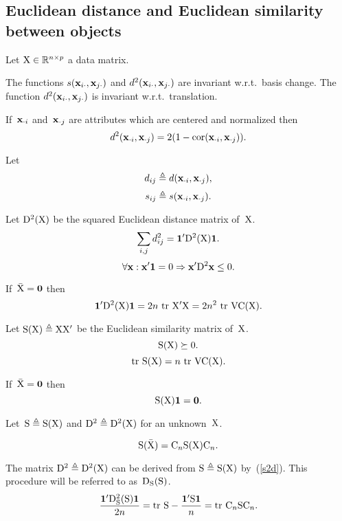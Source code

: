 \documentclass[10pt,a4paper]{article}
\theoremstyle{plain} \newtheorem{Lem}{Lemma}
\begin{document}
\subsection {Euclidean distance and Euclidean similarity between objects}
Let $\mathrm X \in \mathbb R^{n \times p}$ a data matrix.

The functions $s(\mathbf x_{i \cdot}, \mathbf x_{j \cdot})$ and $d^2(\mathbf x_{i \cdot}, \mathbf x_{j \cdot})$ are invariant w.r.t.~basis change.
The function $d^2(\mathbf x_{i\cdot}, \mathbf x_{j\cdot})$ is invariant w.r.t.~translation.

If~$\mathbf x_{\cdot i}$ and~$\mathbf x_{\cdot j}$ are attributes which are centered and normalized
then
\begin{equation}\label{d2rho}
d^2(\mathbf x_{\cdot i}, \mathbf x_{\cdot j}) = 2 (1 - \mathrm {cor}(\mathbf x_{\cdot i}, \mathbf x_{\cdot j})).
\end{equation}

Let
$$ d_{ij} \triangleq d(\mathbf x_{\cdot i}, \mathbf x_{\cdot j}), $$
$$ s_{ij} \triangleq s(\mathbf x_{\cdot i}, \mathbf x_{\cdot j}). $$

Let $\mathrm D^2(\mathrm X)$ be the squared Euclidean distance matrix of~$\mathrm X$.
$$ \sum_{i,j} d^2_{ij} = \mathbf 1' \mathrm D^2(\mathrm X) \mathbf 1. $$
$$ \forall \mathbf x : \mathbf x' \mathbf 1 = 0 \Rightarrow \mathbf x' \mathrm D^2 \mathbf x \le 0. $$

If~$\bar {\mathrm X} = \mathbf 0$ then
\begin{equation}\label{sumD2}
\mathbf 1' \mathrm D^2(\mathrm X) \mathbf 1 = 2n \ \mathrm {tr} \  \mathrm X' \mathrm X  = 2n^2 \ \mathrm {tr} \  \mathrm {VC} (\mathrm X).
\end{equation}

Let $\mathrm S(\mathrm X) \triangleq \mathrm X \mathrm X'$ be the Euclidean similarity matrix of~$\mathrm X$.
$$\mathrm S(\mathrm X) \succeq 0. $$
\begin{equation}\label{trc_S_VC}
  \mathrm {tr} \  \mathrm S(\mathrm X) = n \ \mathrm {tr} \  \mathrm {VC}(\mathrm X).
\end{equation}

If~$\bar {\mathrm X} = \mathbf 0$ then
$$ \mathrm S(\mathrm X) \mathbf 1 = \mathbf 0. $$

Let~$\mathrm S \triangleq \mathrm S(\mathrm X)$ and $\mathrm D^2 \triangleq \mathrm D^2 (\mathrm X)$ for an unknown~$\mathrm X$.

$$ \mathrm S(\bar {\mathrm X}) =  \mathrm C_n {\mathrm S} (\mathrm X)  \mathrm C_n. $$

The matrix $\mathrm D^2 \triangleq \mathrm D^2(\mathrm X)$ can be derived from $\mathrm S \triangleq \mathrm S (\mathrm X)$ by~(\ref{s2d}).
This procedure will be referred to as~$\mathrm D_{\mathrm S}(\mathrm S)$.
$$ \frac {\mathbf 1' \mathrm D_{\mathrm S}^2(\mathrm S) \mathbf 1} {2n} = \mathrm {tr} \  \mathrm S - \frac {\mathbf 1' \mathrm S \mathbf 1} n = \mathrm {tr} \  \mathrm C_n \mathrm S \mathrm C_n. $$
\end{document}
